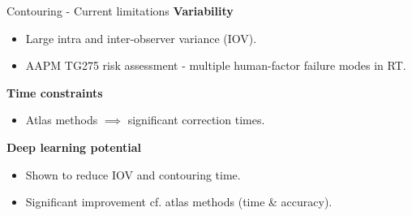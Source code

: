 \documentclass[9pt]{beamer}
\begin{document}
\begin{frame}{Contouring - Current limitations }
\textbf{Variability}
\begin{itemize}
\item Large intra and inter-observer variance (IOV).\footnotemark[1]
\item  AAPM TG275 risk assessment - multiple human-factor failure modes in RT.\footnotemark[2]
\end{itemize}
\vspace{4mm}

\textbf{Time constraints}
\begin{itemize}
	\item Atlas methods $\implies$ significant correction times.\footnotemark[3]
\end{itemize}
\vspace{4mm}

\textbf{Deep learning potential}
\begin{itemize}
	\item Shown to reduce IOV and contouring time.\footnotemark[3]
	\item Significant improvement cf. atlas methods (time \& accuracy).\footnotemark[4]
\end{itemize}
\end{frame}
%
\end{document}
